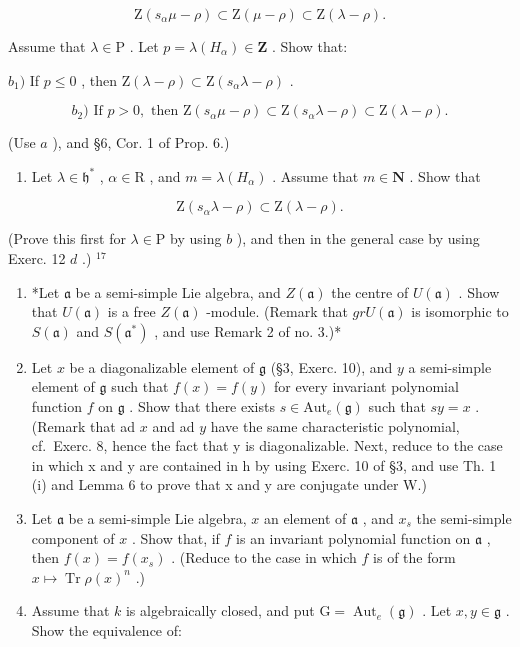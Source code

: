\[
\mathrm{Z} (s _ {\alpha} \mu - \rho) \subset \mathrm{Z} (\mu - \rho) \subset \mathrm{Z} (\lambda - \rho).
\]

Assume that \(\lambda \in \mathrm{P}\) . Let \(p = \lambda (H_{\alpha})\in \mathbf{Z}\) . Show that:

\(b_{1})\) If \(p \leq 0\) , then \(\mathrm{Z}(\lambda - \rho) \subset \mathrm{Z}(s_{\alpha}\lambda - \rho)\) .

\[
b _ {2}) \text {   If   } p > 0, \text {   then   } \mathrm{Z} (s _ {\alpha} \mu - \rho) \subset \mathrm{Z} (s _ {\alpha} \lambda - \rho) \subset \mathrm{Z} (\lambda - \rho).
\]

(Use \(a\) ), and §6, Cor. 1 of Prop. 6.)

\begin{enumerate}
\def\labelenumi{\alph{enumi})}
\setcounter{enumi}{2}
\tightlist
\item
  Let \(\lambda \in \mathfrak{h}^*\) , \(\alpha \in \mathrm{R}\) , and \(m = \lambda(H_{\alpha})\) . Assume that \(m \in \mathbf{N}\) . Show that
\end{enumerate}

\[
\mathrm{Z} (s _ {\alpha} \lambda - \rho) \subset \mathrm{Z} (\lambda - \rho).
\]

(Prove this first for \(\lambda \in \mathrm{P}\) by using \(b\) ), and then in the general case by using Exerc. 12 \(d\) .) \(^{17}\)

\begin{enumerate}
\def\labelenumi{\arabic{enumi})}
\setcounter{enumi}{13}
\item
  *Let \(\mathfrak{a}\) be a semi-simple Lie algebra, and \(Z(\mathfrak{a})\) the centre of \(U(\mathfrak{a})\) . Show that \(U(\mathfrak{a})\) is a free \(Z(\mathfrak{a})\) -module. (Remark that \(grU(\mathfrak{a})\) is isomorphic to \(S(\mathfrak{a})\) and \(S(\mathfrak{a}^*)\) , and use Remark 2 of no. 3.)*
\item
  Let \(x\) be a diagonalizable element of \(\mathfrak{g}\) (§3, Exerc. 10), and \(y\) a semi-simple element of \(\mathfrak{g}\) such that \(f(x) = f(y)\) for every invariant polynomial function \(f\) on \(\mathfrak{g}\) . Show that there exists \(s \in \mathrm{Aut}_e(\mathfrak{g})\) such that \(sy = x\) . (Remark that ad \(x\) and ad \(y\) have the same characteristic polynomial, cf.~Exerc. 8, hence the fact that y is diagonalizable. Next, reduce to the case in which x and y are contained in h by using Exerc. 10 of §3, and use Th. 1 (i) and Lemma 6 to prove that x and y are conjugate under W.)
\item
  Let \(\mathfrak{a}\) be a semi-simple Lie algebra, \(x\) an element of \(\mathfrak{a}\) , and \(x_{s}\) the semi-simple component of \(x\) . Show that, if \(f\) is an invariant polynomial function on \(\mathfrak{a}\) , then \(f(x) = f(x_{s})\) . (Reduce to the case in which \(f\) is of the form \(x \mapsto \operatorname{Tr} \rho(x)^n\) .)
\item
  Assume that \(k\) is algebraically closed, and put \(\mathrm{G} = \operatorname{Aut}_e(\mathfrak{g})\) . Let \(x, y \in \mathfrak{g}\) . Show the equivalence of:
\end{enumerate}

